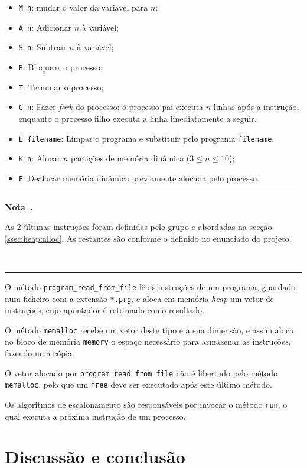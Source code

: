 \documentclass[10pt,oneside]{estiloUBI}
\newcounter{note}
\newenvironment{note}[1][]
	{
		\medskip \refstepcounter{note} \par \medskip
		\noindent\textcolor[RGB]{220,220,220}{\rule{\linewidth}{0.4pt}}
		\noindent \textbf{Nota~\thenote. #1} \rmfamily
	}
	{
		\\ \noindent\textcolor[RGB]{220,220,220}{\rule{\linewidth}{0.4pt}} \medskip
	}
\begin{document}
	\begin{itemize}
		\item \verb|M n|: mudar o valor da variável para $n$;
		\item \verb|A n|: Adicionar $n$ à variável;
		\item \verb|S n|: Subtrair $n$ à variável;
		\item \verb|B|: Bloquear o processo;
		\item \verb|T|: Terminar o processo;
		\item \verb|C n|: Fazer \textit{fork} do processo: o processo pai executa $n$ linhas após a instrução, enquanto o processo filho executa a linha imediatamente a seguir.
		\item \verb|L filename|: Limpar o programa e substituir pelo programa \verb|filename|.
		\item \verb|K n|: Alocar $n$ partições de memória dinâmica ($3 \leq n \leq 10$);
		\item \verb|F|: Dealocar memória dinâmica previamente alocada pelo processo.
	\end{itemize}

	\begin{note}
		As 2 últimas instruções foram definidas pelo grupo e abordadas na secção \ref{ssec:heap:alloc}. As restantes são conforme o definido no enunciado do projeto.
	\end{note}
	
	O método \verb|program_read_from_file| lê as instruções de um programa, guardado num ficheiro com a extensão \verb|*.prg|, e aloca em memória \textit{heap} um vetor de instruções, cujo apontador é retornado como resultado.
	
	O método \verb|memalloc| recebe um vetor deste tipo e a sua dimensão, e assim aloca no bloco de memória \verb|memory| o espaço necessário para armazenar as instruções, fazendo uma cópia.
	
	O vetor alocado por \verb|program_read_from_file| não é libertado pelo método \verb|memalloc|, pelo que um \verb|free| deve ser executado após este último método.
	
	Os algoritmos de escalonamento são responsáveis por invocar o método \verb|run|, o qual executa a próxima instrução de um processo.
	
	
	\chapter{Discussão e conclusão}
	\label{sec:con_futwork}
	
\end{document}
